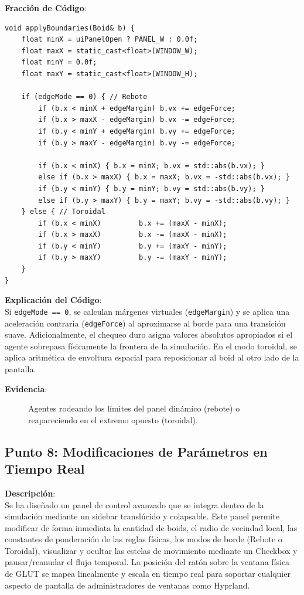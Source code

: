 \documentclass[11pt,a4paper]{article}
\begin{document}
\textbf{Fracción de Código}:
\begin{lstlisting}[caption={Control de límites espaciales en simulacion.cpp}, label={lst:boundaries}]
void applyBoundaries(Boid& b) {
    float minX = uiPanelOpen ? PANEL_W : 0.0f;
    float maxX = static_cast<float>(WINDOW_W);
    float minY = 0.0f;
    float maxY = static_cast<float>(WINDOW_H);

    if (edgeMode == 0) { // Rebote
        if (b.x < minX + edgeMargin) b.vx += edgeForce;
        if (b.x > maxX - edgeMargin) b.vx -= edgeForce;
        if (b.y < minY + edgeMargin) b.vy += edgeForce;
        if (b.y > maxY - edgeMargin) b.vy -= edgeForce;

        if (b.x < minX) { b.x = minX; b.vx = std::abs(b.vx); }
        else if (b.x > maxX) { b.x = maxX; b.vx = -std::abs(b.vx); }
        if (b.y < minY) { b.y = minY; b.vy = std::abs(b.vy); }
        else if (b.y > maxY) { b.y = maxY; b.vy = -std::abs(b.vy); }
    } else { // Toroidal
        if (b.x < minX)         b.x += (maxX - minX);
        if (b.x > maxX)         b.x -= (maxX - minX);
        if (b.y < minY)         b.y += (maxY - minY);
        if (b.y > maxY)         b.y -= (maxY - minY);
    }
}
\end{lstlisting}

\textbf{Explicación del Código}: \\
Si \lstinline{edgeMode == 0}, se calculan márgenes virtuales (\lstinline{edgeMargin}) y se aplica una aceleración contraria (\lstinline{edgeForce}) al aproximarse al borde para una transición suave. Adicionalmente, el chequeo duro asigna valores absolutos apropiados si el agente sobrepasa físicamente la frontera de la simulación. En el modo toroidal, se aplica aritmética de envoltura espacial para reposicionar al boid al otro lado de la pantalla.

\textbf{Evidencia}:
\begin{figure}[htbp]
    \centering
    \caption{Agentes rodeando los límites del panel dinámico (rebote) o reapareciendo en el extremo opuesto (toroidal).}
    \label{fig:evidencia_punto7}
\end{figure}

\newpage

\subsection{Punto 8: Modificaciones de Parámetros en Tiempo Real}
\textbf{Descripción}: \\
Se ha diseñado un panel de control avanzado que se integra dentro de la simulación mediante un sidebar translúcido y colapsable. Este panel permite modificar de forma inmediata la cantidad de boids, el radio de vecindad local, las constantes de ponderación de las reglas físicas, los modos de borde (Rebote o Toroidal), visualizar y ocultar las estelas de movimiento mediante un Checkbox y pausar/reanudar el flujo temporal. La posición del ratón sobre la ventana física de GLUT se mapea linealmente y escala en tiempo real para soportar cualquier aspecto de pantalla de administradores de ventanas como Hyprland.
\end{document}

